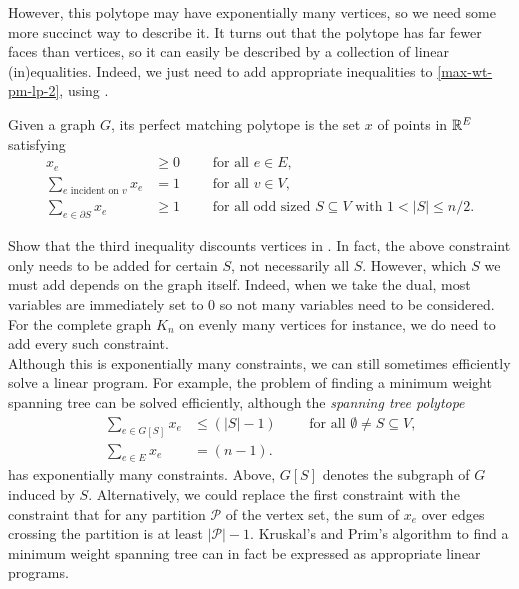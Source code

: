 	However, this polytope may have exponentially many vertices, so we need some more succinct way to describe it. It turns out that the polytope has far fewer faces than vertices, so it can easily be described by a collection of linear (in)equalities. Indeed, we just need to add appropriate inequalities to \eqref{max-wt-pm-lp-2}, using .
	
	\begin{ftheo}
		Given a graph $G$, its perfect matching polytope is the set $x$ of points in $\mathbb{R}^E$ satisfying
		\begin{align}
			x_e &\ge 0 \qquad \text{ for all } e \in E, \\
			\sum_{e \text{ incident on }v} x_e &= 1 \qquad \text{ for all } v \in V, \\
			\sum_{e \in \partial S} x_e &\ge 1 \qquad \text{ for all odd sized $S \subseteq V$ with $1 < |S| \le n/2$}.
		\end{align}
	\end{ftheo}
	Show that the third inequality discounts vertices in . In fact, the above constraint only needs to be added for certain $S$, not necessarily all $S$. However, which $S$ we must add depends on the graph itself. Indeed, when we take the dual, most variables are immediately set to $0$ so not many variables need to be considered. For the complete graph $K_{n}$ on evenly many vertices for instance, we do need to add every such constraint.\\
	Although this is exponentially many constraints, we can still sometimes efficiently solve a linear program. For example, the problem of finding a minimum weight spanning tree can be solved efficiently, although the \emph{spanning tree polytope}
	\begin{align*}
		\sum_{e \in G[S]} x_e &\le (|S|-1) \qquad \text{ for all $\emptyset \ne S \subseteq V$,} \\
		\sum_{e \in E} x_e &= (n-1).
	\end{align*}
	has exponentially many constraints. Above, $G[S]$ denotes the subgraph of $G$ induced by $S$. Alternatively, we could replace the first constraint with the constraint that for any partition $\mathcal{P}$ of the vertex set, the sum of $x_e$ over edges crossing the partition is at least $|\mathcal{P}|-1$. Kruskal's and Prim's algorithm to find a minimum weight spanning tree can in fact be expressed as appropriate linear programs.
